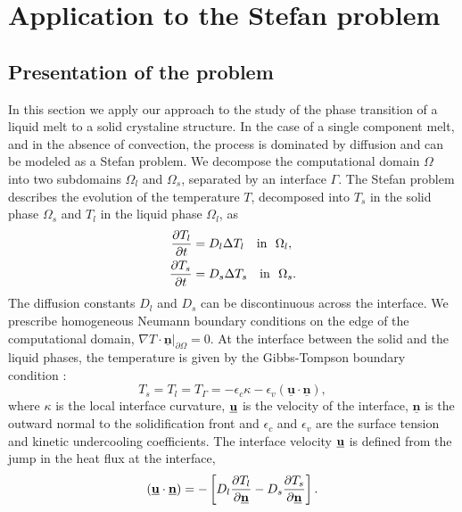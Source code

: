\section{Application to the Stefan problem} \label{sec:application}

\subsection{Presentation of the problem}

In this section we apply our approach to the study of the phase transition of a liquid melt to a solid crystaline structure. In the case of a single component melt, and in the absence of convection, the process is dominated by diffusion and can be modeled as a Stefan problem. We decompose the computational domain $\Omega$ into two subdomains $\Omega_l$ and $\Omega_s$, separated by an interface $\Gamma$. The Stefan problem describes the evolution of the temperature $T$, decomposed into $T_s$ in the solid phase $\Omega_s$ and $T_l$ in the liquid phase $\Omega_l$, as
\begin{align}
\frac{\partial T_l}{\partial t} & = D_l \Delta T_l \quad \mathrm{in} ~~ \Omega_l, \label{eq:stefan_heat_equation_l} \\
\frac{\partial T_s}{\partial t} & = D_s \Delta T_s \quad \mathrm{in} ~~ \Omega_s. \label{eq:stefan_heat_equation_s}
\end{align}
The diffusion constants $D_l$ and $D_s$ can be discontinuous across the interface. We prescribe homogeneous Neumann boundary conditions on the edge of the computational domain, $\nabla T \cdot \underline{\mathbf{n}}\vert_{\partial \Omega}=0$. At the interface between the solid and the liquid phases, the temperature is given by the Gibbs-Tompson boundary condition \cite{Alexiades;Solomon;Wilson:88:The-formation-of-a-s, Alexiades;Solomon:93:Mathematical-Modelin}:
\begin{equation} \label{eq:stefan_gibbs_tompson}
T_s = T_l = T_{\Gamma} = -\epsilon_c \kappa - \epsilon_v (\underline{\mathbf{u}} \cdot \underline{\mathbf{n}}),
\end{equation}
where $\kappa$ is the local interface curvature, $\underline{\mathbf{u}}$ is the velocity of the interface, $\underline{\mathbf{n}}$ is the outward normal to the solidification front and $\epsilon_c$ and $\epsilon_v$ are the surface tension and kinetic undercooling coefficients. The interface velocity $\underline{\mathbf{u}}$ is defined from the jump in the heat flux at the interface,
\begin{equation} \label{eq:stefan_velocity}
(\underline{\mathbf{u}} \cdot \underline{\mathbf{n}}) = - \left[ D_l \frac{\partial T_l}{\partial \underline{\mathbf{n}}} - D_s \frac{\partial T_s}{\partial \underline{\mathbf{n}}} \right].
\end{equation}
